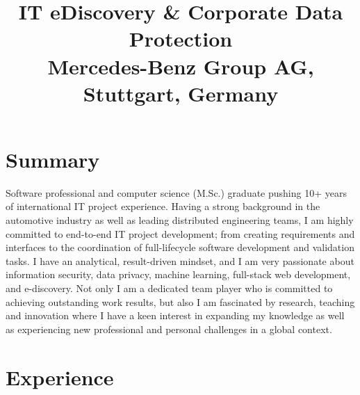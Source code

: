 \documentclass[11pt,a4paper,sans]{moderncv}        %
\title{\large IT eDiscovery \& Corporate Data Protection \\ Mercedes-Benz Group AG, Stuttgart, Germany}                               %
\begin{document}
\makecvtitle

\section{Summary}
Software professional and computer science (M.Sc.) graduate pushing 10+ years of international IT
project experience. Having a strong background in the automotive industry as well as leading
distributed engineering teams, I am highly committed to end-to-end IT project development; \linebreak from
creating requirements and interfaces to the coordination of full-lifecycle software development and
validation tasks. I have an analytical, result-driven mindset, and I am very passionate about
information security, data privacy, machine learning, full-stack web development, and e-discovery. Not only I am a
dedicated team player who is committed to achieving outstanding work results, but also I am
fascinated by research, teaching and innovation where I have a keen interest in expanding my knowledge
as well as experiencing new professional and personal challenges in a global context.

\section{Experience}
\end{document}
